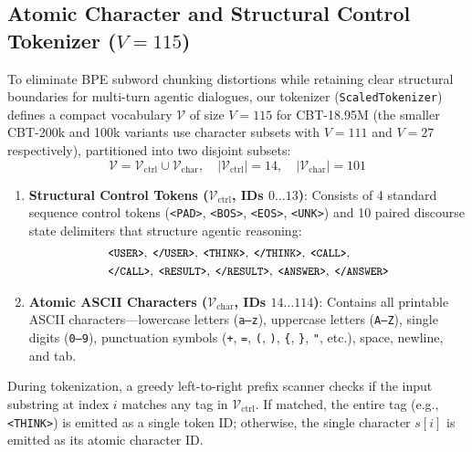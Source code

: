 \documentclass[10pt,twocolumn]{article}
\begin{document}
\subsection{Atomic Character and Structural Control Tokenizer ($V=115$)}

To eliminate BPE subword chunking distortions while retaining clear structural boundaries for multi-turn agentic dialogues, our tokenizer (\texttt{ScaledTokenizer}) defines a compact vocabulary $\mathcal{V}$ of size $V=115$ for CBT-18.95M (the smaller CBT-200k and 100k variants use character subsets with $V=111$ and $V=27$ respectively), partitioned into two disjoint subsets:
\begin{equation}
\mathcal{V} = \mathcal{V}_{\text{ctrl}} \cup \mathcal{V}_{\text{char}}, \quad |\mathcal{V}_{\text{ctrl}}| = 14, \quad |\mathcal{V}_{\text{char}}| = 101
\end{equation}
\begin{enumerate}[leftmargin=*,nosep]
    \item \textbf{Structural Control Tokens ($\mathcal{V}_{\text{ctrl}}$, IDs $0 \dots 13$)}: Consists of 4 standard sequence control tokens (\texttt{<PAD>}, \texttt{<BOS>}, \texttt{<EOS>}, \texttt{<UNK>}) and 10 paired discourse state delimiters that structure agentic reasoning:
    \begin{equation*}
    \small
    \begin{aligned}
    &\texttt{<USER>},\; \texttt{</USER>},\; \texttt{<THINK>},\; \texttt{</THINK>},\; \texttt{<CALL>},\\
    &\texttt{</CALL>},\; \texttt{<RESULT>},\; \texttt{</RESULT>},\; \texttt{<ANSWER>},\; \texttt{</ANSWER>}
    \end{aligned}
    \end{equation*}
    \item \textbf{Atomic ASCII Characters ($\mathcal{V}_{\text{char}}$, IDs $14 \dots 114$)}: Contains all printable ASCII characters—lowercase letters (\texttt{a--z}), uppercase letters (\texttt{A--Z}), single digits (\texttt{0--9}), punctuation symbols (\texttt{+}, \texttt{=}, \texttt{(}, \texttt{)}, \texttt{\{}, \texttt{\}}, \texttt{"}, etc.), space, newline, and tab.
\end{enumerate}
During tokenization, a greedy left-to-right prefix scanner checks if the input substring at index $i$ matches any tag in $\mathcal{V}_{\text{ctrl}}$. If matched, the entire tag (e.g., \texttt{<THINK>}) is emitted as a single token ID; otherwise, the single character $s[i]$ is emitted as its atomic character ID.
\end{document}
